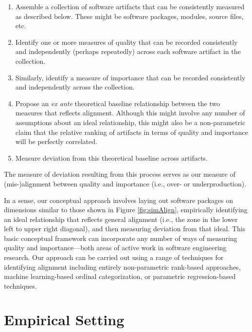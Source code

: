 \documentclass[10pt,conference]{IEEEtran}\usepackage[]{graphicx}\usepackage[usenames,dvipsnames]{color}
\begin{document}
\begin{enumerate}
    \item Assemble a collection of software artifacts that can be consistently measured as described below. These might be software packages, modules, source files, etc.
    \item Identify one or more measures of quality that can be recorded consistently and independently (perhaps repeatedly) across each software artifact in the collection.
    \item Similarly, identify a measure of importance that can be recorded consistently and independently across the collection.
    \item Propose an \textit{ex ante} theoretical baseline relationship between the two measures that reflects alignment. Although this might involve any number of assumptions about an ideal relationship, this might also be a non-parametric claim that the relative ranking of artifacts in terms of quality and importance will be perfectly correlated.
    \item Measure deviation from this theoretical baseline across artifacts.
\end{enumerate}

\noindent The measure of deviation resulting from this process serves as our measure of (mis-)alignment between quality and importance (i.e., over- or underproduction). 
 
In a sense, our conceptual approach involves laying out software packages on dimensions similar to those shown in Figure \ref{fig:simAlign}, empirically identifying an ideal relationship that reflects general alignment (i.e., the zone in the lower left to upper right diagonal), and then measuring deviation from that ideal. This basic conceptual framework can incorporate any number of ways of measuring quality and importance---both areas of active work in software engineering research. Our approach can be carried out using a range of techniques for identifying alignment including entirely non-parametric rank-based approaches, machine learning-based ordinal categorization, or parametric regression-based techniques. 



\section{Empirical Setting}
\label{sec:debian}
\end{document}
